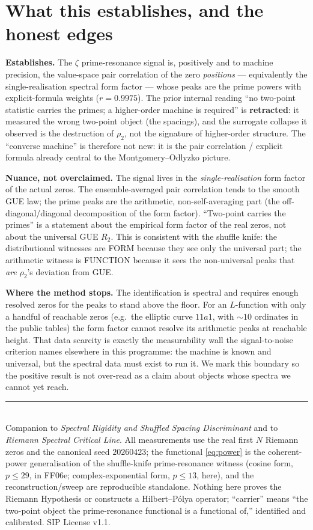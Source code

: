 \documentclass[11pt]{article}
\begin{document}
\section{What this establishes, and the honest edges}\label{sec:scope}

\textbf{Establishes.} The $\zeta$ prime-resonance signal is, positively and to machine precision, the value-space pair correlation of the zero \emph{positions} --- equivalently the single-realisation spectral form factor --- whose peaks are the prime powers with explicit-formula weights ($r=0.9975$). The prior internal reading ``no two-point statistic carries the primes; a higher-order machine is required'' is \textbf{retracted}: it measured the wrong two-point object (the spacings), and the surrogate collapse it observed is the destruction of $\rho_2$, not the signature of higher-order structure. The ``converse machine'' is therefore not new: it is the pair correlation / explicit formula already central to the Montgomery--Odlyzko picture.

\textbf{Nuance, not overclaimed.} The signal lives in the \emph{single-realisation} form factor of the actual zeros. The ensemble-averaged pair correlation tends to the smooth GUE law; the prime peaks are the arithmetic, non-self-averaging part (the off-diagonal/diagonal decomposition of the form factor). ``Two-point carries the primes'' is a statement about the empirical form factor of the real zeros, not about the universal GUE $R_2$. This is consistent with the shuffle knife: the distributional witnesses are FORM because they see only the universal part; the arithmetic witness is FUNCTION because it sees the non-universal peaks that \emph{are} $\rho_2$'s deviation from GUE.

\textbf{Where the method stops.} The identification is spectral and requires enough resolved zeros for the peaks to stand above the floor. For an $L$-function with only a handful of reachable zeros (e.g.\ the elliptic curve $11a1$, with $\sim\!10$ ordinates in the public tables) the form factor cannot resolve its arithmetic peaks at reachable height. That data scarcity is exactly the measurability wall the signal-to-noise criterion names elsewhere in this programme: the machine is known and universal, but the spectral data must exist to run it. We mark this boundary so the positive result is not over-read as a claim about objects whose spectra we cannot yet reach.

\vspace{1em}
\noindent\rule{\linewidth}{0.4pt}\\
\small Companion to \textit{Spectral Rigidity and Shuffled Spacing Discriminant} and to \textit{Riemann Spectral Critical Line}. All measurements use the real first $N$ Riemann zeros and the canonical seed $20260423$; the functional \eqref{eq:power} is the coherent-power generalisation of the shuffle-knife prime-resonance witness (cosine form, $p \le 29$, in FF06e; complex-exponential form, $p \le 13$, here), and the reconstruction/sweep are reproducible standalone. Nothing here proves the Riemann Hypothesis or constructs a Hilbert--P\'olya operator; ``carrier'' means ``the two-point object the prime-resonance functional is a functional of,'' identified and calibrated. SIP License v1.1.
\end{document}
